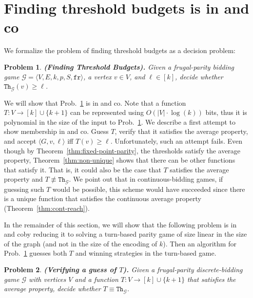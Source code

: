 \documentclass{theoretics}
\newcommand{\G}{{\mathcal G}}
\newcommand{\fr}{\texttt{fr}}
\newcommand{\thresh}{\texttt{Th}\xspace}
\newcommand{\zug}[1]{\langle #1  \rangle}
\newtheorem{problem}{Problem}
\begin{document}
\section{Finding threshold budgets is in \NP and co\NP}
\label{sec:NP and coNP}

We formalize the problem of finding threshold budgets as a decision problem: 
\begin{problem}
\label{prob:decision-threshold}
{\bf (Finding Threshold Budgets).}
Given a frugal-parity bidding game $\G = \zug{V, E, k, p, S, \fr}$, a vertex $v \in V$, and $\ell \in [k]$, decide whether $\thresh_\G(v) \geq \ell$.
\end{problem}

We will show that Prob.~\ref{prob:decision-threshold} is in \NP and co\NP. 
Note that a function \(T : V \rightarrow [k] \cup \{k+1\}\) can be represented using $O(|V| \cdot \log(k))$ bits, thus it is polynomial in the size of the input to Prob.~\ref{prob:decision-threshold}. 
We describe a first attempt to show membership in \NP and co\NP. Guess $T$, verify that it satisfies the average property, and accept $\zug{G, v, \ell}$ iff $T(v) \geq \ell$. 
Unfortunately, such an attempt fails. Even though by Theorem~\ref{thm:fixed-point-parity}, the thresholds satisfy the average property, Theorem~\ref{thm:non-unique} shows that there can be other functions that satisfy it. That is, it could also be the case that $T$ satisfies the average property and $T \not \equiv \thresh_\G$. 
We point out that in continuous-bidding games, if guessing such $T$ would be possible, this scheme would have succeeded since there is a unique function that satisfies the continuous average property (Theorem~\ref{thm:cont-reach}). 

In the remainder of this section, we will show that the following problem is in \NP and co\NP by reducing it to solving a turn-based parity game of size linear in the size of the graph (and not in the size of the encoding of \(k\)). 
Then an algorithm for Prob.~\ref{prob:decision-threshold} guesses both \(T\) and winning strategies in the turn-based game. 

\begin{problem}
\label{prob:thresh-equiv}
{\bf (Verifying a guess of $T$).} Given a frugal-parity discrete-bidding game $\G$ with vertices $V$ and a function \(T : V \rightarrow [k] \cup \{k+1\}\) that satisfies the average property, decide whether \(T \equiv \thresh_\G\).
\end{problem}
\end{document}
